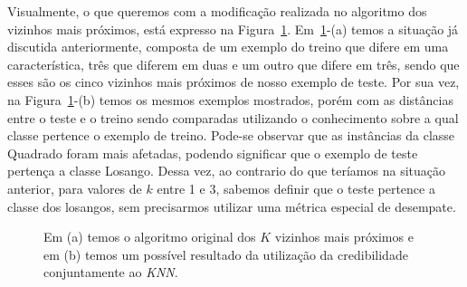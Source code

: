 Visualmente, o que queremos com a modificação realizada no algoritmo dos vizinhos mais próximos, está expresso na Figura~\ref{fig::KNNantesedepois}. Em~\ref{fig::KNNantesedepois}-(a) temos a situação já discutida anteriormente, composta de um exemplo do treino que difere em uma característica, três que diferem em duas e um outro que difere em três, sendo que esses são os cinco vizinhos mais próximos de nosso exemplo de teste. Por sua vez, na Figura~\ref{fig::KNNantesedepois}-(b) temos os mesmos exemplos mostrados, porém com as distâncias entre o teste e o treino sendo comparadas utilizando o conhecimento sobre a qual classe pertence o exemplo de treino. Pode-se observar que as instâncias da classe Quadrado foram mais afetadas, podendo significar que o exemplo de teste pertença a classe Losango. Dessa vez, ao contrario do que teríamos na situação anterior, para valores de $k$ entre 1 e 3, sabemos definir que o teste pertence a classe dos losangos, sem precisarmos utilizar uma métrica especial de desempate. 

\begin{figure}[ht]
\centering
{}
\caption{Em (a) temos o algoritmo original dos $K$ vizinhos mais próximos e em (b) temos um possível resultado da utilização da credibilidade conjuntamente ao \textit{KNN}.  
\label{fig::KNNantesedepois}}
\end{figure}

